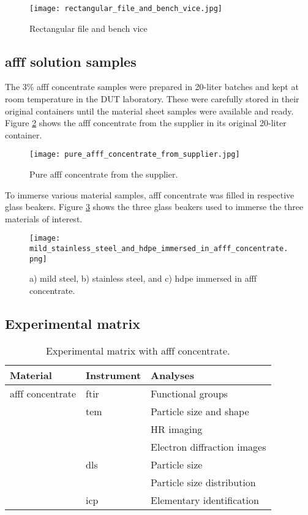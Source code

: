 \begin{figure}[H]
    \centering
    \texttt{[image: rectangular\_file\_and\_bench\_vice.jpg]}
    \caption{Rectangular file and bench vice}
    \label{ch4:figure:file_and_vice}
\end{figure}

\subsection{\acrshort{afff} solution samples}
The 3\% \acrshort{afff} concentrate samples were prepared in 20-liter batches and kept at room temperature in the DUT laboratory. These were carefully stored in their original containers until the material sheet samples were available and ready. Figure \ref{ch4:figure:suplier} shows the \acrshort{afff} concentrate from the supplier in its original 20-liter container.
 
\begin{figure}[H]
    \centering
    \texttt{[image: pure\_afff\_concentrate\_from\_supplier.jpg]}
    \caption{Pure \acrshort{afff} concentrate from the supplier.}
    \label{ch4:figure:suplier}
\end{figure}

To immerse various material samples, \acrshort{afff} concentrate was filled in respective glass beakers. Figure \ref{ch4:figure:immersed} shows the three glass beakers used to immerse the three materials of interest.
 
\begin{figure}[H]
\texttt{[image: mild\_stainless\_steel\_and\_hdpe\_immersed\_in\_afff\_concentrate.png]}
\caption{a) mild steel, b) stainless steel, and c) \acrshort{hdpe} immersed in \acrshort{afff} concentrate.}
\label{ch4:figure:immersed}
\end{figure}

\subsection{Experimental matrix}

\begin{table}[H]
\centering
\caption{Experimental matrix with \acrshort{afff} concentrate.}

\renewcommand{\arraystretch}{2.5}
\begin{tabularx}{\textwidth}{ XXX }
    \hline
    Material & Instrument & Analyses \\
    \hline
    \acrshort{afff} concentrate & \acrshort{ftir} & Functional groups \\
    & \acrshort{tem} & Particle size and shape \\
    & & HR imaging \\
    & & Electron diffraction images \\
    & \acrshort{dls} & Particle size \\
    & & Particle size distribution \\
    & \acrshort{icp} & Elementary identification \\
    \hline
\end{tabularx}

\end{table}

